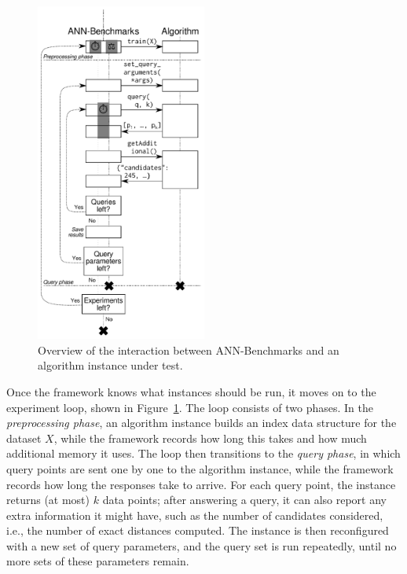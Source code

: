 \begin{figure}
\vspace{-20pt}
\includegraphics[width=0.5\textwidth]{scheme-v}
\caption{Overview of the interaction between ANN-Benchmarks and an algorithm
instance under test.}
\label{fig:overview:experiment}
\end{figure}

Once the framework knows what instances should be run, it moves on to the
experiment
loop, shown in Figure~\ref{fig:overview:experiment}.
The loop consists of two phases.
In the \emph{preprocessing phase}, an algorithm instance builds an index data
structure for the dataset $X$, while the framework records how long this takes
and how much additional memory it uses.
The loop then transitions to the \emph{query
phase}, in which query points are sent one by one to the algorithm instance,
while the framework records how long the responses take to arrive.
For each query point, the instance returns (at most) $k$ data points; after
answering a query, it can also report any extra
information it might have, such as the number of candidates considered, i.e., 
the number of exact distances computed. The instance
is then reconfigured with a new set of query parameters, and the query set is
run repeatedly, until no more sets of these parameters remain.

